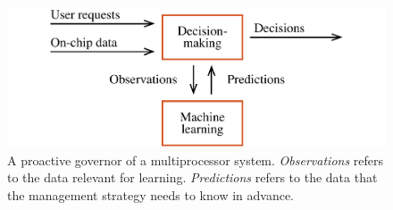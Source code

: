 \begin{figure}
  \centering
  \includegraphics[width=1.0\columnwidth]{include/assets/figures/governor.pdf}
  \caption{A proactive governor of a multiprocessor system. \emph{Observations}
  refers to the data relevant for learning. \emph{Predictions} refers to the
  data that the management strategy needs to know in advance.}
\end{figure}
